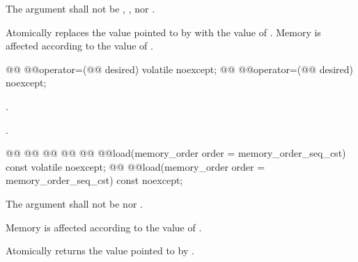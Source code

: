 \begin{itemdescr}
\pnum
\requires The  argument shall not be ,
, nor .

\pnum
\effects Atomically replaces the value pointed to  by 
with the value of . Memory is affected according to the value of
.
\end{itemdescr}

%
%
%
\begin{itemdecl}
@@ @@operator=(@@ desired) volatile noexcept;
@@ @@operator=(@@ desired) noexcept;
\end{itemdecl}

\begin{itemdescr}
\pnum
\effects {} .

\pnum
\returns {}.
\end{itemdescr}

%
%
%
%
%
\begin{itemdecl}
@@
@@
@@
@@
@@ @@load(memory_order order = memory_order_seq_cst) const volatile noexcept;
@@ @@load(memory_order order = memory_order_seq_cst) const noexcept;
\end{itemdecl}

\begin{itemdescr}
\pnum
\requires The  argument shall not be  nor .

\pnum
\effects Memory is affected according to the value of .

\pnum
\returns Atomically returns the value pointed to  by .
\end{itemdescr}

